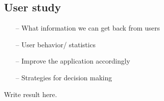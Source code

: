 \subsection{User study}
\begin{itemize}
\item[--]What information we can get back from users
\item[--]User behavior/ statistics
\item[--]Improve the application accordingly
\item[--]Strategies for decision making
\end{itemize}
Write result here.